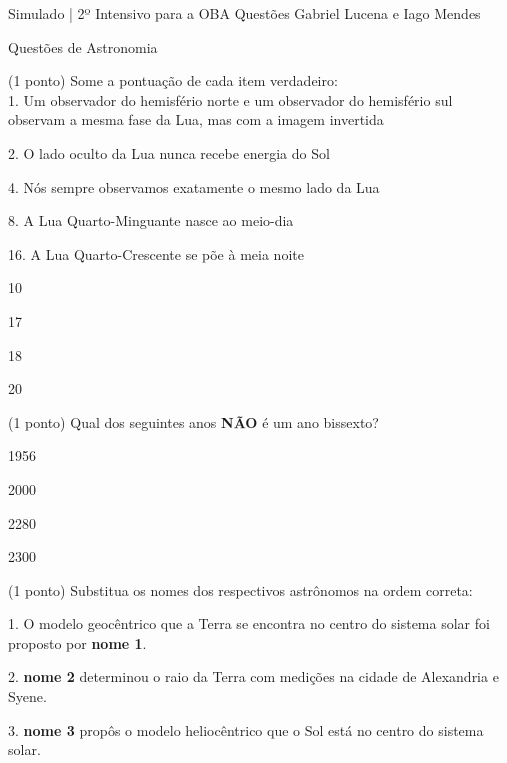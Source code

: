 \documentclass{../lista}
\begin{document}
	\cabecalhoAlt
	{Simulado | 2º Intensivo para a OBA}
	{Questões}
	{Gabriel Lucena e Iago Mendes}

	\begin{secao}{Questões de Astronomia}
		\begin{questao}{(1 ponto)}
			Some a pontuação de cada item verdadeiro: \\
			
			1. Um observador do hemisfério norte e um observador do hemisfério sul observam a mesma fase da Lua, mas com a imagem invertida
			
			2. O lado oculto da Lua nunca recebe energia do Sol
			
			4. Nós sempre observamos exatamente o mesmo lado da Lua 
			
			8. A Lua Quarto-Minguante nasce ao meio-dia
			
			16. A Lua Quarto-Crescente se põe à meia noite
			
			\begin{alternativas}
				\item 10
				\item 17
				\item 18
				\item 20
			\end{alternativas}
			
		\end{questao}

		\begin{questao}{(1 ponto)}
			Qual dos seguintes anos \textbf{NÃO} é um ano bissexto?
			
			\begin{alternativas}
				\item 1956
				\item 2000
				\item 2280
				\item 2300
			\end{alternativas}
		\end{questao}

		\begin{questao}{(1 ponto)}
			Substitua os nomes dos respectivos astrônomos na ordem correta:
			
			1. O modelo geocêntrico que a Terra se encontra no centro do sistema solar foi proposto por \textbf{nome 1}.
			
			2. \textbf{nome 2} determinou o raio da Terra com medições na cidade de Alexandria e Syene.
			
			3. \textbf{nome 3} propôs o modelo heliocêntrico que o Sol está no centro do sistema solar.
			

\end{questao}
\end{secao}
\end{document}
